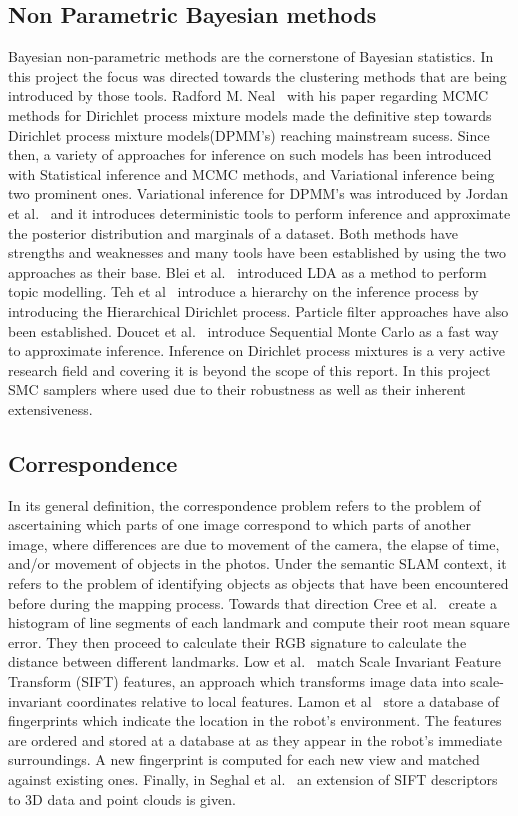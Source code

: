 \documentclass[twoside,hidelinks]{article}
\begin{document}
\subsection{Non Parametric Bayesian methods}

Bayesian non-parametric methods are the cornerstone of Bayesian statistics. In this project the focus was directed towards the clustering methods that are being introduced by those tools. Radford M. Neal~\cite{bayes:neal} with his paper regarding MCMC methods for Dirichlet process mixture models made the definitive step towards Dirichlet process mixture models(DPMM's) reaching mainstream sucess. Since then, a variety of approaches for inference on such models has been introduced with Statistical inference and MCMC methods, and Variational inference being two prominent ones. Variational inference for DPMM's was introduced by Jordan et al.~\cite{bayes:jordan} and it introduces deterministic tools to perform inference and approximate the posterior distribution and marginals of a dataset. Both methods have strengths and weaknesses and many tools have been established by using the two approaches as their base. Blei et al.~\cite{LDA} introduced LDA as a method to perform topic modelling. Teh et al~\cite{bayes:hier} introduce a hierarchy on the inference process by introducing the Hierarchical Dirichlet process. Particle filter approaches have also been established. Doucet et al.~\cite{bayes:smc} introduce Sequential Monte Carlo as a fast way to approximate inference. Inference on Dirichlet process mixtures is a very active research field and covering it is beyond the scope of this report. In this project SMC samplers where used due to their robustness as well as their inherent extensiveness. 

\subsection{Correspondence}

In its general definition, the correspondence problem refers to the problem of ascertaining which parts of one image correspond to which parts of another image, where differences are due to movement of the camera, the elapse of time, and/or movement of objects in the photos. Under the semantic SLAM context, it refers to the problem of identifying objects as objects that have been encountered before during the mapping process. Towards that direction Cree et al.~\cite{corresp:first} create a histogram of line segments of each landmark and compute their root mean square error. They then proceed to calculate their RGB signature to calculate the distance between different landmarks. Low et al.~\cite{corres:sec} match Scale Invariant Feature Transform (SIFT) features, an approach which transforms image data into scale-invariant coordinates relative to local features. Lamon et al~\cite{corres:three} store a database of fingerprints which indicate the location in the robot's environment. The features are ordered and stored at a database at as they appear in the robot's immediate surroundings. A new fingerprint is computed for each new view and matched against existing ones. Finally, in Seghal et al.~\cite{corres:four} an extension of SIFT descriptors to 3D data and point clouds is given.
\end{document}
